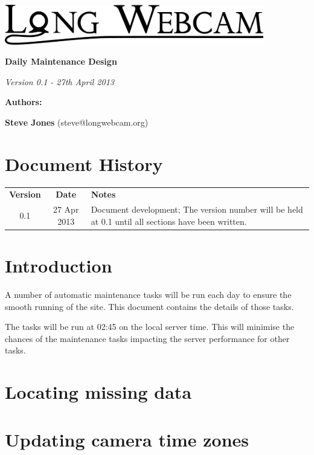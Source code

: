 \documentclass[11pt]{article}
\begin{document}
\begin{titlepage}
\begin{center}

\includegraphics[width=0.85\textwidth]{./Logo_Large-cropped_black.png}

\vspace{3 cm}

\textbf{\Huge{Daily Maintenance Design}}

\vspace{1 cm}

\textit{\large{Version 0.1 - 27th April 2013}}

\vspace{4 cm}

\textbf{\Large{Authors:}}

\textbf{Steve Jones} (steve@longwebcam.org)

\end{center}

\end{titlepage}

\setcounter{tocdepth}{2}
\tableofcontents
\clearpage
{}
\section*{Document History}
\begin{table}[tbhp!]
\begin{tabular}{ c c p{4in} }
\textbf{Version} & \textbf{Date} & \textbf{Notes} \\
0.1 & 27 Apr 2013 & Document development; The version number will be held at 0.1 until all sections have been written. \\
\end{tabular}
\end{table}

\clearpage
{}

\section{Introduction}
A number of automatic maintenance tasks will be run each day to ensure the smooth running of the site. This document contains the details of those tasks.

The tasks will be run at 02:45 on the local server time. This will minimise the chances of the maintenance tasks impacting the server performance for other tasks. 

\section{Locating missing data}

\section{Updating camera time zones}
\end{document}
